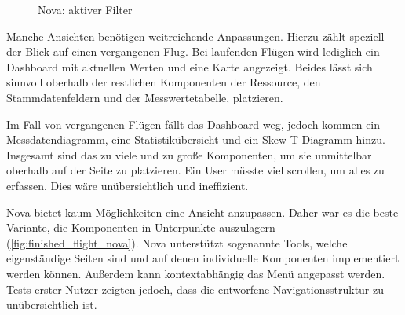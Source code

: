 \begin{figure}[h!]
    \centering
    \caption{Nova: aktiver Filter}
    \label{fig:active_filter_nova}
\end{figure}
\color{black}

\newpage

Manche Ansichten benötigen weitreichende Anpassungen.
Hierzu zählt speziell der Blick auf einen vergangenen Flug.
Bei laufenden Flügen wird lediglich ein Dashboard mit aktuellen Werten und eine Karte angezeigt.
Beides lässt sich sinnvoll oberhalb der restlichen Komponenten der Ressource, den Stammdatenfeldern und der Messwertetabelle, platzieren.

Im Fall von vergangenen Flügen fällt das Dashboard weg, jedoch kommen ein Messdatendiagramm, eine Statistikübersicht und ein Skew-T-Diagramm hinzu.
Insgesamt sind das zu viele und zu große Komponenten, um sie unmittelbar oberhalb auf der Seite zu platzieren.
Ein User müsste viel scrollen, um alles zu erfassen.
Dies wäre unübersichtlich und ineffizient.

Nova bietet kaum Möglichkeiten eine Ansicht anzupassen.
Daher war es die beste Variante, die Komponenten in Unterpunkte auszulagern (\ref{fig:finished_flight_nova}).
Nova unterstützt sogenannte Tools, welche eigenständige Seiten sind und auf denen individuelle Komponenten implementiert werden können.
Außerdem kann kontextabhängig das Menü angepasst werden.
Tests erster Nutzer zeigten jedoch, dass die entworfene Navigationsstruktur zu unübersichtlich ist.

\newpage


